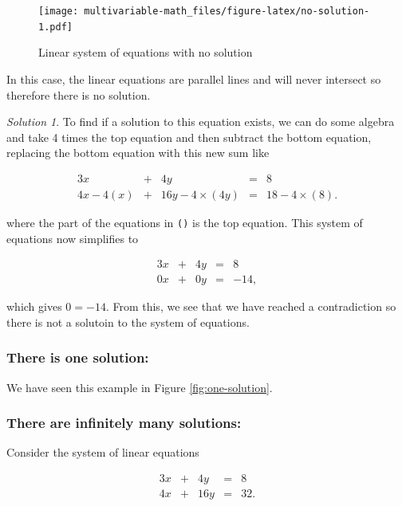 \documentclass[
]{book}
\theoremstyle{definition}
\theoremstyle{definition}
\theoremstyle{definition}
\theoremstyle{definition}
\theoremstyle{remark}
\newtheorem*{solution}{Solution}
\begin{document}
\begin{figure}
\centering
\texttt{[image: multivariable-math\_files/figure-latex/no-solution-1.pdf]}
\caption{\label{fig:no-solution}Linear system of equations with no solution}
\end{figure}

In this case, the linear equations are parallel lines and will never intersect so therefore there is no solution.

\begin{solution}
To find if a solution to this equation exists, we can do some algebra and take 4 times the top equation and then subtract the bottom equation, replacing the bottom equation with this new sum like

\begin{alignat*}{3}
x   & {}+{} & 4 y & {}={} & 8 \\
4 x  - 4(x) & {}+{} & 16 y - 4\times (4 y) & {}={} & 18 - 4 \times (8).
\end{alignat*}

where the part of the equations in \texttt{()} is the top equation. This system of equations now simplifies to

\begin{alignat*}{3}
x & {}+{} & 4 y & {}={} & 8 \\
0 x & {}+{} &  0 y & {}={} & -14,
\end{alignat*}

which gives \(0 = -14\). From this, we see that we have reached a contradiction so there is not a solutoin to the system of equations.
\end{solution}

\hypertarget{there-is-one-solution}{%
\subsubsection{There is one solution:}\label{there-is-one-solution}}

We have seen this example in Figure \ref{fig:one-solution}.

\hypertarget{there-are-infinitely-many-solutions}{%
\subsubsection{There are infinitely many solutions:}\label{there-are-infinitely-many-solutions}}

Consider the system of linear equations

\begin{alignat*}{3}
x   & {}+{} & 4 y & {}={} & 8 \\
4 x & {}+{} & 16 y & {}={} & 32.
\end{alignat*}
\end{document}
